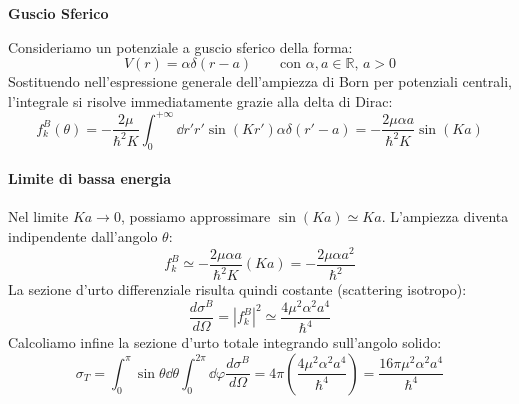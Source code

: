 \begin{example}
    \textbf{Guscio Sferico}
    
    Consideriamo un potenziale a guscio sferico della forma:
    \[
        V(r) = \alpha \delta(r-a) \qquad \text{con } \alpha, a \in \mathbb{R}, \, a > 0
    \]
    Sostituendo nell'espressione generale dell'ampiezza di Born per potenziali centrali, l'integrale si risolve immediatamente grazie alla delta di Dirac:
    \[
        f_k^B(\theta) = -\frac{2\mu}{\hbar^2 K} \int_0^{+\infty} \dd{r'} r' \sin(Kr') \alpha \delta(r'-a) = -\frac{2\mu \alpha a}{\hbar^2 K} \sin(Ka)
    \]

    \paragraph{Limite di bassa energia}
    Nel limite \( Ka \to 0 \), possiamo approssimare \( \sin(Ka) \simeq Ka \). L'ampiezza diventa indipendente dall'angolo \( \theta \):
    \[
        f_k^B \simeq -\frac{2\mu \alpha a}{\hbar^2 K} (Ka) = -\frac{2\mu \alpha a^2}{\hbar^2}
    \]
    La sezione d'urto differenziale risulta quindi costante (scattering isotropo):
    \[
        \frac{d\sigma^B}{d\Omega} = |f_k^B|^2 \simeq \frac{4\mu^2 \alpha^2 a^4}{\hbar^4}
    \]
    Calcoliamo infine la sezione d'urto totale integrando sull'angolo solido:
    \[
        \sigma_T = \int_0^{\pi} \sin\theta \dd{\theta} \int_0^{2\pi} \dd{\varphi} \frac{d\sigma^B}{d\Omega} = 4\pi \left( \frac{4\mu^2 \alpha^2 a^4}{\hbar^4} \right) = \frac{16\pi \mu^2 \alpha^2 a^4}{\hbar^4}
    \]
\end{example}

